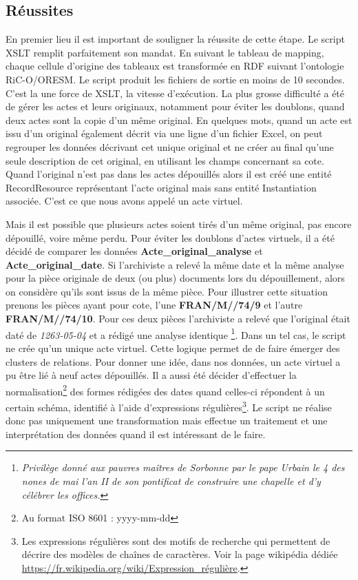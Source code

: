 \subsection{Réussites}
En premier lieu il est important de souligner la réussite de cette étape. Le script XSLT remplit parfaitement son mandat. En suivant le tableau de mapping, chaque cellule d'origine des tableaux est transformée en RDF suivant l'ontologie RiC-O/ORESM. Le script produit les fichiers de sortie en moins de 10 secondes. C'est la une force de XSLT, la vitesse d'exécution. La plus grosse difficulté a été de gérer les actes et leurs originaux, notamment pour éviter les doublons, quand deux actes sont la copie d'un même original. En quelques mots, quand un acte est issu d'un original également décrit via une ligne d'un fichier Excel, on peut regrouper les données décrivant cet unique original et ne créer au final qu'une seule description de cet original, en utilisant les champs concernant sa cote. Quand l'original n'est pas dans les actes dépouillés alors il est créé une entité RecordResource représentant l'acte original mais sans entité Instantiation associée. C'est ce que nous avons appelé un acte \og virtuel\fg. 
\par
Mais il est possible que plusieurs actes soient tirés d'un même original, pas encore dépouillé, voire même perdu. Pour éviter les doublons d'actes virtuels, il a été décidé de comparer les données \textbf{Acte\_original\_analyse} et \textbf{Acte\_original\_date}. Si l'archiviste a relevé la même date et la même analyse pour la pièce originale de deux (ou plus) documents lors du dépouillement, alors on considère qu'ils sont issus de la même pièce. Pour illustrer cette situation prenons les pièces ayant pour cote, l'une \textbf{FRAN/M//74/9} et l'autre \textbf{FRAN/M//74/10}. Pour ces deux pièces l'archiviste a relevé que l'original était daté de \textit{1263-05-04} et a rédigé une analyse identique \footnote{\textit{Privilège donné aux pauvres maîtres de Sorbonne par le pape Urbain le 4 des nones de mai l’an II de son pontificat de construire une chapelle et d’y célébrer les offices.}}. Dans un tel cas, le script ne crée qu'un unique acte virtuel. Cette logique permet de de faire émerger des clusters de relations. Pour donner une idée, dans nos données, un acte virtuel a pu être lié à neuf actes dépouillés. Il a aussi été décider d'effectuer la normalisation\footnote{Au format ISO 8601 : yyyy-mm-dd} des formes rédigées des dates quand celles-ci répondent à un certain schéma, identifié à l'aide d'expressions régulières\footnote{Les expressions régulières sont des motifs de recherche qui permettent de décrire des modèles de chaînes de caractères. Voir la page wikipédia dédiée \href{https://fr.wikipedia.org/wiki/Expression\_r\%C3\%A9guli\%C3\%A8re}{https://fr.wikipedia.org/wiki/Expression\_régulière}.}. Le script ne réalise donc pas uniquement une transformation mais effectue un traitement et une interprétation des données quand il est intéressant de le faire.


